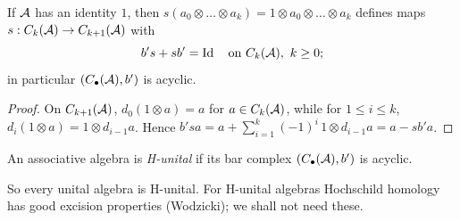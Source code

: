 \begin{lemma}\label{hochschild:lem:bar-acyclic}
If $\mathcal{A}$ has an identity $1$, then $s(a_0\otimes\dots\otimes a_k)=1\otimes
a_0\otimes\dots\otimes a_k$ defines maps $s:C_k(\mathcal{A})\to C_{k+1}(\mathcal{A})$ with
\begin{equation*}
  b's+sb'=\Id\quad\text{on }C_k(\cA),\ k\ge0;
\end{equation*}
in particular $(C_\bullet(\mathcal{A}),b')$ is acyclic.
\end{lemma}
\begin{proof}
On $C_{k+1}(\mathcal{A})$, $d_0(1\otimes a)=a$ for $a\in C_k(\mathcal{A})$, while for $1\le
i\le k$, $d_i(1\otimes a)=1\otimes d_{i-1}a$. Hence
$b'sa=a+\sum_{i=1}^{k}(-1)^i\,1\otimes d_{i-1}a=a-sb'a$.
\end{proof}

\begin{definition}\label{hochschild:def:H-unital}
An associative algebra is \emph{H-unital} if its bar complex
$(C_\bullet(\mathcal{A}),b')$ is acyclic.
\end{definition}

So every unital algebra is H-unital. For H-unital algebras Hochschild homology
has good excision properties (Wodzicki); we shall not need these.

